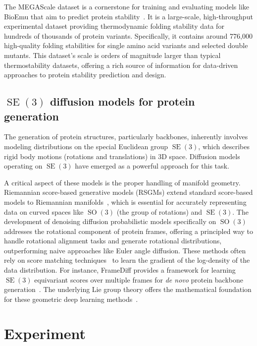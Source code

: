 \documentclass{article}
\theoremstyle{plain}
\theoremstyle{definition}
\theoremstyle{remark}
\DeclareMathOperator{\SE}{SE}
\DeclareMathOperator{\SO}{SO}
\begin{document}
The MEGAScale dataset is a cornerstone for training and evaluating models like BioEmu that aim to predict protein stability~\cite{megascale}. It is a large-scale, high-throughput experimental dataset providing thermodynamic folding stability data for hundreds of thousands of protein variants. Specifically, it contains around 776,000 high-quality folding stabilities for single amino acid variants and selected double mutants. This dataset's scale is orders of magnitude larger than typical thermostability datasets, offering a rich source of information for data-driven approaches to protein stability prediction and design.

\subsection{$\SE(3)$ diffusion models for protein generation}

The generation of protein structures, particularly backbones, inherently involves modeling distributions on the special Euclidean group $\SE(3)$, which describes rigid body motions (rotations and translations) in 3D space. Diffusion models operating on $\SE(3)$ have emerged as a powerful approach for this task.

A critical aspect of these models is the proper handling of manifold geometry. Riemannian score-based generative models (RSGMs) extend standard score-based models to Riemannian manifolds~\cite{riemannian_diffusion}, which is essential for accurately representing data on curved spaces like $\SO(3)$ (the group of rotations) and $\SE(3)$. The development of denoising diffusion probabilistic models specifically on $\SO(3)$~\cite{so3_diffusion} addresses the rotational component of protein frames, offering a principled way to handle rotational alignment tasks and generate rotational distributions, outperforming naive approaches like Euler angle diffusion. These methods often rely on score matching techniques~\cite{score_based_diffusion} to learn the gradient of the log-density of the data distribution. For instance, FrameDiff provides a framework for learning $\SE(3)$ equivariant scores over multiple frames for \textit{de novo} protein backbone generation~\cite{se3_diffusion}. The underlying Lie group theory offers the mathematical foundation for these geometric deep learning methods~\cite{micro_lie_theory}.

\section{Experiment}
\end{document}
